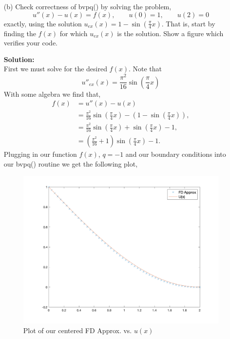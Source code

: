 \documentclass[12pt]{article}
\makeatletter
\theoremstyle{homework}
\newenvironment{exercise}[1]
{\def\@currentlabel{#1}\exercisecore}
{\endexercisecore}
\newcommand{\localhead}[1]{\par\smallskip\noindent\textbf{#1}\nobreak\\}%
\newcommand\solution{\localhead{Solution:}}
\makeatother
\begin{document}
\begin{exercise}{Problem P15}
\begin{enumerate}
    \item[(b)] Check correctness of bvpq() by solving the problem, 
    \begin{equation*}
      u''(x) - u(x) = f(x),\qquad u(0) = 1,\qquad u(2) = 0
    \end{equation*}
    exactly, using the solution $u_{ex}(x) = 1 - \sin(\frac{\pi}{4}x)$. That is, start by finding the $f(x)$
    for which $u_{ex}(x)$ is the solution. Show a figure which verifies your code. 
    \solution First we must solve for the desired $f(x)$. Note that 
    \begin{equation*}
      u''_{ex}(x) = \frac{\pi ^2}{16}\sin \left(\frac{\pi}{4}x\right)
    \end{equation*}
    With some algebra we find that, 
    \begin{align*}
      f(x) &=  u''(x) - u(x)\\
      &=\frac{\pi ^2}{16}\sin\left(\frac{\pi}{4}x\right) - \left(1 - \sin\left(\frac{\pi}{4}x\right)\right),\\
      &=\frac{\pi ^2}{16}\sin\left(\frac{\pi}{4}x\right) + \sin\left(\frac{\pi}{4}x\right) - 1,\\
      &=\left(\frac{\pi ^2}{16} + 1\right)\sin\left(\frac{\pi}{4}x\right) - 1.
    \end{align*}
    Plugging in our function $f(x)$, $q = -1$ and our boundary conditions into our bvpq() routine we get the following 
    plot, 
    \begin{figure}[H]
      \begin{center}
        \caption{Plot of our centered FD Approx. vs. $u(x)$}
        \includegraphics[width=.90\textwidth]{fig.png}
      \end{center}
    \end{figure}



\end{enumerate}
\end{exercise}
\end{document}
